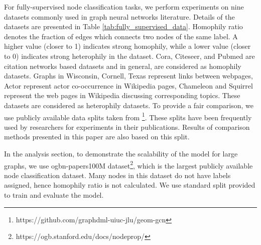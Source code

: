 \documentclass[sigconf,natbib=false]{acmart}
\begin{document}
For fully-supervised node classification tasks, we perform experiments on nine datasets commonly used in graph neural networks literature. Details of the datasets are presented in Table \ref{tab:fully_supervised_data}. Homophily ratio \cite{zhu_beyond_2020} denotes the fraction of edges which connects two nodes of the same label. A higher value (closer to 1) indicates strong homophily, while a lower value (closer to 0) indicates strong heterophily in the dataset. Cora, Citeseer, and Pubmed \cite{sen_collective_2008} are citation networks based datasets and in general, are considered as homophily datasets. Graphs in Wisconsin, Cornell, Texas \cite{pei_geom-gcn_2020} represent links between webpages, Actor \cite{tang_social_2009} represent actor co-occurrence in Wikipedia pages, Chameleon and Squirrel \cite{rozemberczki_multi-scale_2020} represent the web pages in Wikipedia discussing corresponding topics. These datasets are considered as heterophily datasets. To provide a fair comparison, we use publicly available data splits taken from \cite{pei_geom-gcn_2020}\footnote{https://github.com/graphdml-uiuc-jlu/geom-gcn}. These splits have been frequently used by researchers for experiments in their publications. Results of comparison methods presented in this paper are also based on this split.

In the analysis section, to demonstrate the scalability of the model for large graphs, we use ogbn-papers100M dataset\footnote{https://ogb.stanford.edu/docs/nodeprop/}, which is the largest publicly available node classification dataset. Many nodes in this dataset do not have labels assigned, hence homophily ratio is not calculated. We use standard split provided \cite{hu_open_2021} to train and evaluate the model. 
\end{document}
